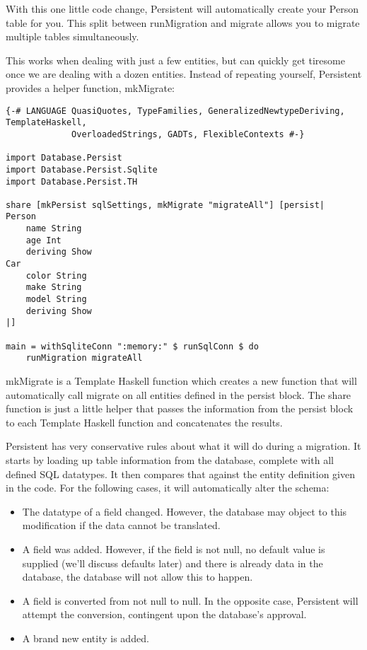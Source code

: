 With this one little code change, Persistent will automatically create your Person table for you. This split between runMigration and migrate allows you to migrate multiple tables simultaneously.

This works when dealing with just a few entities, but can quickly get tiresome once we are dealing with a dozen entities. Instead of repeating yourself, Persistent provides a helper function, mkMigrate:

\begin{lstlisting}
{-# LANGUAGE QuasiQuotes, TypeFamilies, GeneralizedNewtypeDeriving, TemplateHaskell,
             OverloadedStrings, GADTs, FlexibleContexts #-}

import Database.Persist
import Database.Persist.Sqlite
import Database.Persist.TH

share [mkPersist sqlSettings, mkMigrate "migrateAll"] [persist|
Person
    name String
    age Int
    deriving Show
Car
    color String
    make String
    model String
    deriving Show
|]

main = withSqliteConn ":memory:" $ runSqlConn $ do
    runMigration migrateAll
\end{lstlisting}%

mkMigrate is a Template Haskell function which creates a new function that will automatically call migrate on all entities defined in the persist block. The share function is just a little helper that passes the information from the persist block to each Template Haskell function and concatenates the results.

Persistent has very conservative rules about what it will do during a migration. It starts by loading up table information from the database, complete with all defined SQL datatypes. It then compares that against the entity definition given in the code. For the following cases, it will automatically alter the schema:

\begin{itemize}
	\item The datatype of a field changed. However, the database may object to this modification if the data cannot be translated.
	\item A field was added. However, if the field is not null, no default value is supplied (we'll discuss defaults later) and there is already data in the database, the database will not allow this to happen.
	\item A field is converted from not null to null. In the opposite case, Persistent will attempt the conversion, contingent upon the database's approval.
	\item A brand new entity is added.
\end{itemize}

